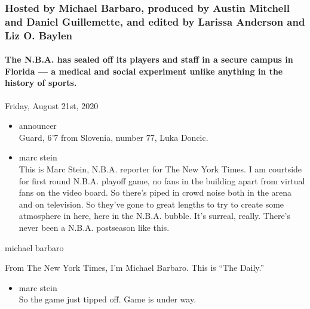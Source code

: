\hypertarget{hosted-by-michael-barbaro-produced-by-austin-mitchell-and-daniel-guillemette-and-edited-by-larissa-anderson-and-liz-o-baylen}{%
\subsubsection{Hosted by Michael Barbaro, produced by Austin Mitchell
and Daniel Guillemette, and edited by Larissa Anderson and Liz O.
Baylen}\label{hosted-by-michael-barbaro-produced-by-austin-mitchell-and-daniel-guillemette-and-edited-by-larissa-anderson-and-liz-o-baylen}}

\hypertarget{the-nba-has-sealed-off-its-players-and-staff-in-a-secure-campus-in-florida--a-medical-and-social-experiment-unlike-anything-in-the-history-of-sports}{%
\paragraph{The N.B.A. has sealed off its players and staff in a secure
campus in Florida --- a medical and social experiment unlike anything in
the history of
sports.}\label{the-nba-has-sealed-off-its-players-and-staff-in-a-secure-campus-in-florida--a-medical-and-social-experiment-unlike-anything-in-the-history-of-sports}}

Friday, August 21st, 2020

\begin{itemize}
\item
  announcer\\
  Guard, 6'7 from Slovenia, number 77, Luka Doncic.
\item
  marc stein\\
  This is Marc Stein, N.B.A. reporter for The New York Times. I am
  courtside for first round N.B.A. playoff game, no fans in the building
  apart from virtual fans on the video board. So there's piped in crowd
  noise both in the arena and on television. So they've gone to great
  lengths to try to create some atmosphere in here, here in the N.B.A.
  bubble. It's surreal, really. There's never been a N.B.A. postseason
  like this.
\end{itemize}

michael barbaro

From The New York Times, I'm Michael Barbaro. This is ``The Daily.''

\begin{itemize}
\tightlist
\item
  marc stein\\
  So the game just tipped off. Game is under way.
\end{itemize}


